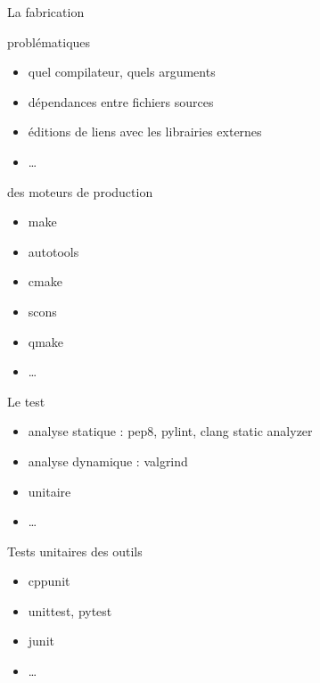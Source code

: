 \documentclass[9pt]{beamer}
\begin{document}
\begin{frame}{La fabrication}
\begin{block}{problématiques}
  \begin{itemize}
  \item quel compilateur, quels arguments
  \item dépendances entre fichiers sources
  \item éditions de liens avec les librairies externes
  \item \dots
  \end{itemize}
\end{block}
\begin{block}{des moteurs de production}
  \begin{itemize}
  \item make
  \item autotools
  \item cmake
  \item scons
  \item qmake
  \item \dots
  \end{itemize}
\end{block}
\end{frame}

\begin{frame}{Le test}
\begin{block}{}
  \begin{itemize}
  \item analyse statique    : pep8, pylint, clang static analyzer
  \item analyse dynamique   : valgrind
  \item unitaire
  \item \dots
  \end{itemize}
\end{block}
\begin{block}{Tests unitaires des outils}
  \begin{itemize}
  \item cppunit
  \item unittest, pytest
  \item junit
  \item \dots
  \end{itemize}
\end{block}
\end{frame}
\end{document}
